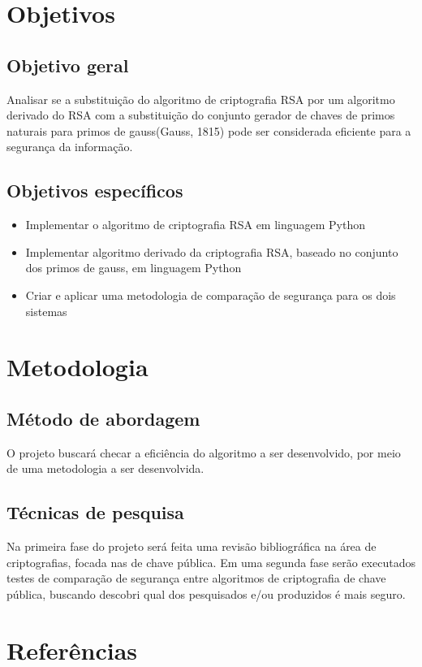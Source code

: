 \documentclass{article}
\begin{document}
	\section{Objetivos}
	\subsection{Objetivo geral}
	Analisar se a substituição do algoritmo de criptografia RSA por um algoritmo derivado do RSA com a substituição do conjunto gerador de chaves de primos naturais para primos de gauss(Gauss, 1815) pode ser considerada eficiente para a segurança da informação.
	\subsection{Objetivos específicos}
	\begin{itemize}
		\item{
			Implementar o algoritmo de criptografia RSA em linguagem Python
		}
		\item{
			Implementar algoritmo derivado da criptografia RSA, baseado no conjunto dos primos de gauss, em linguagem Python
		}
		\item{
			Criar e aplicar uma metodologia de comparação de segurança para os dois sistemas
		}
	\end{itemize}
	\section{Metodologia}
	\subsection{Método de abordagem}
	O projeto buscará checar a eficiência do algoritmo a ser desenvolvido, por meio de uma metodologia a ser desenvolvida.
	\subsection{Técnicas de pesquisa}
	Na primeira fase do projeto será feita uma revisão bibliográfica na área de criptografias, focada nas de chave pública. Em uma segunda fase serão executados testes de comparação de segurança entre algoritmos de criptografia de chave pública, buscando descobri qual dos pesquisados e/ou produzidos é mais seguro.
	
	\section{Referências}
	\cite{newdirections}
	\cite{gauss}
	\cite{riemann}
	\cite{rivest}
	\cite{shannon}
	\cite{sinkov}
	\cite{millenial}
	\printbibliography
	
\end{document}
